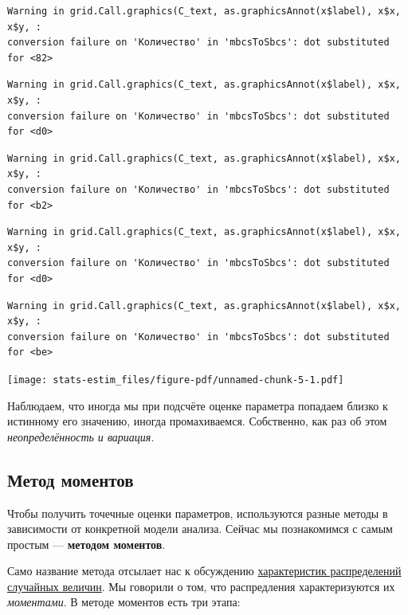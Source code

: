 \documentclass[
  letterpaper,
]{scrbook}
\theoremstyle{definition}
\theoremstyle{remark}
\begin{document}
\begin{verbatim}
Warning in grid.Call.graphics(C_text, as.graphicsAnnot(x$label), x$x, x$y, :
conversion failure on 'Количество' in 'mbcsToSbcs': dot substituted for <82>
\end{verbatim}

\begin{verbatim}
Warning in grid.Call.graphics(C_text, as.graphicsAnnot(x$label), x$x, x$y, :
conversion failure on 'Количество' in 'mbcsToSbcs': dot substituted for <d0>
\end{verbatim}

\begin{verbatim}
Warning in grid.Call.graphics(C_text, as.graphicsAnnot(x$label), x$x, x$y, :
conversion failure on 'Количество' in 'mbcsToSbcs': dot substituted for <b2>
\end{verbatim}

\begin{verbatim}
Warning in grid.Call.graphics(C_text, as.graphicsAnnot(x$label), x$x, x$y, :
conversion failure on 'Количество' in 'mbcsToSbcs': dot substituted for <d0>
\end{verbatim}

\begin{verbatim}
Warning in grid.Call.graphics(C_text, as.graphicsAnnot(x$label), x$x, x$y, :
conversion failure on 'Количество' in 'mbcsToSbcs': dot substituted for <be>
\end{verbatim}

\texttt{[image: stats-estim\_files/figure-pdf/unnamed-chunk-5-1.pdf]}

Наблюдаем, что иногда мы при подсчёте оценке параметра попадаем близко к
истинному его значению, иногда промахиваемся. Собственно, как раз об
этом \emph{неопределённость и вариация}.

\subsection{Метод
моментов}\label{ux43cux435ux442ux43eux434-ux43cux43eux43cux435ux43dux442ux43eux432}

Чтобы получить точечные оценки параметров, используются разные методы в
зависимости от конкретной модели анализа. Сейчас мы познакомимся с самым
простым --- \textbf{методом моментов}.

Само название метода отсылает нас к обсуждению
\hyperref[moments_distributions]{характеристик распределений случайных
величин}. Мы говорили о том, что распредления характеризуются их
\emph{моментами}. В методе моментов есть три этапа:
\end{document}
